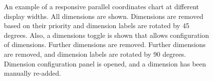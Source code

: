 \begin{figure}[tp]
{
An example of a responsive parallel coordinates chart at different display widths.  All dimensions are shown.  Dimensions are removed based on their priority and dimension labels are rotated by 45 degrees. Also, a dimensions toggle is shown that allows configuration of dimensions.  Further dimensions are removed.  Further dimensions are removed, and dimension labels are rotated by 90 degrees.  Dimension configuration panel is opened, and a dimension has been manually re-added.
}
\label{fig:RespParCoordExample}
\end{figure}

